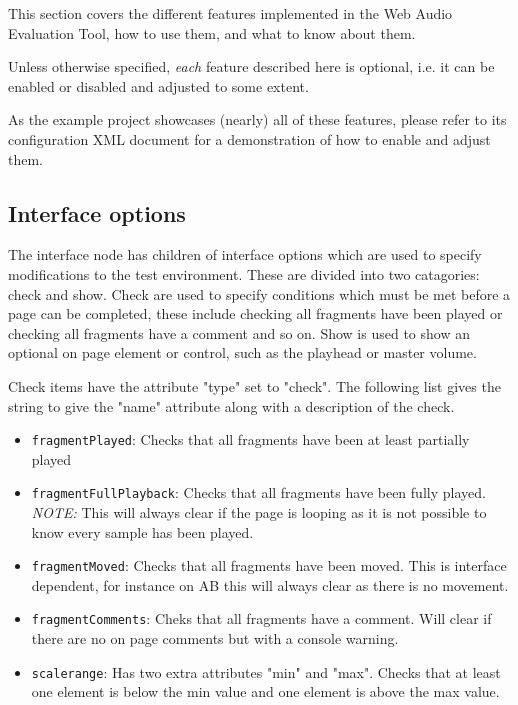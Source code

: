 \documentclass[11pt, oneside]{article}   	%
\begin{document}
	This section covers the different features implemented in the Web Audio Evaluation Tool, how to use them, and what to know about them. 

	Unless otherwise specified, \emph{each} feature described here is optional, i.e. it can be enabled or disabled and adjusted to some extent. 

	As the example project showcases (nearly) all of these features, please refer to its configuration XML document for a demonstration of how to enable and adjust them.

	\subsection{Interface options}
	    The interface node has children of interface options which are used to specify modifications to the test environment. These are divided into two catagories: check and show. Check are used to specify conditions which must be met before a page can be completed, these include checking all fragments have been played or checking all fragments have a comment and so on. Show is used to show an optional on page element or control, such as the playhead or master volume.
	    
	    Check items have the attribute "type" set to "check". The following list gives the string to give the "name" attribute along with a description of the check.
	    \begin{itemize}
	    \item \texttt{fragmentPlayed}: Checks that all fragments have been at least partially played
	    \item \texttt{fragmentFullPlayback}: Checks that all fragments have been fully played. \emph{NOTE:} This will always clear if the page is looping as it is not possible to know every sample has been played.
	    \item \texttt{fragmentMoved}: Checks that all fragments have been moved. This is interface dependent, for instance on AB this will always clear as there is no movement.
	    \item \texttt{fragmentComments}: Cheks that all fragments have a comment. Will clear if there are no on page comments but with a console warning.
	    \item \texttt{scalerange}: Has two extra attributes "min" and "max". Checks that at least one element is below the min value and one element is above the max value.
	    \end{itemize}
\end{document}
